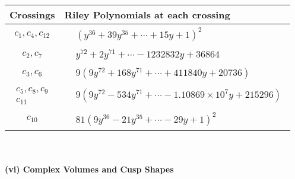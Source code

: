 \documentclass[1p]{elsarticle_modified}
\theoremstyle{definition}
\begin{document}
\begin{tabular}{m{50pt}|m{274pt}}
Crossings & \hspace{64pt}Riley Polynomials at each crossing \\
\hline $$\begin{aligned}c_{1},c_{4},c_{12}\end{aligned}$$&$\begin{aligned}
&(y^{36}+39 y^{35}+\cdots+15 y+1)^{2}
\end{aligned}$\\
\hline $$\begin{aligned}c_{2},c_{7}\end{aligned}$$&$\begin{aligned}
&y^{72}+2 y^{71}+\cdots-1232832 y+36864
\end{aligned}$\\
\hline $$\begin{aligned}c_{3},c_{6}\end{aligned}$$&$\begin{aligned}
&9(9 y^{72}+168 y^{71}+\cdots+411840 y+20736)
\end{aligned}$\\
\hline $$\begin{aligned}c_{5},c_{8},c_{9}\\c_{11}\end{aligned}$$&$\begin{aligned}
&9(9 y^{72}-534 y^{71}+\cdots-1.10869\times10^{7} y+215296)
\end{aligned}$\\
\hline $$\begin{aligned}c_{10}\end{aligned}$$&$\begin{aligned}
&81(9 y^{36}-21 y^{35}+\cdots-29 y+1)^{2}
\end{aligned}$\\
\hline
\end{tabular}\\~\\
\newpage\flushleft \textbf{(vi) Complex Volumes and Cusp Shapes}
\end{document}
